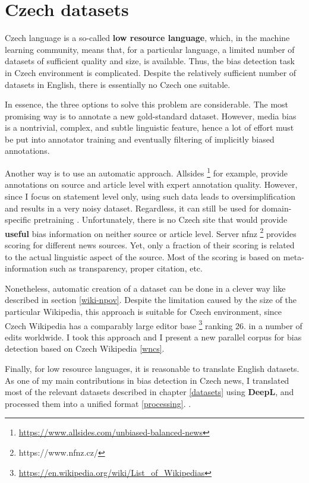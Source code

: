 \chapter{Czech datasets}
Czech language is a so-called \textbf{low resource language}, which, in the machine learning community, means that, for a particular language, a limited number of datasets of sufficient quality  and size, is available. Thus, the bias detection task in Czech environment is complicated. Despite the relatively sufficient number of datasets in English, there is essentially no Czech one suitable.

 In essence, the three options to solve this problem are considerable. The most promising way is to annotate a new gold-standard dataset. However, media bias is a nontrivial, complex, and subtle linguistic feature, hence a lot of effort must be put into annotator training and eventually filtering of implicitly biased annotations.
 
 Another way is to use an automatic approach. Allsides \footnote{\url{https://www.allsides.com/unbiased-balanced-news}} for example, provide annotations on source and article level with expert annotation quality. However, since I focus on statement level only, using such data leads to oversimplification and results in a very noisy dataset. Regardless, it can still be used for domain-specific pretraining \cite{Spinde2021f}. Unfortunately, there is no Czech site that would provide \textbf{useful} bias information on neither source or article level. Server \Gls{nfnz} \footnote{https://www.nfnz.cz/} provides scoring for different news sources. Yet, only a fraction of their scoring is related to the actual linguistic aspect of the source. Most of the scoring is based on meta-information such as transparency, proper citation, etc.
 
 Nonetheless, automatic creation of a dataset can be done in a clever way like described in section \ref{wiki-npov}. Despite the limitation caused by the size of the particular Wikipedia, this approach is suitable for Czech environment, since Czech Wikipedia has a comparably large editor base \footnote{ \url{https://en.wikipedia.org/wiki/List_of_Wikipedias}} ranking 26. in a number of edits worldwide. I took this approach and I present a new parallel corpus for bias detection based on Czech Wikipedia \ref{wncs}.
 
 Finally, for low resource languages, it is reasonable to translate English datasets. As one of my main contributions in bias detection in Czech news, I translated most of the relevant datasets described in chapter \ref{datasets} using \textbf{DeepL}, and processed them into a unified format \ref{processing}. .
 
